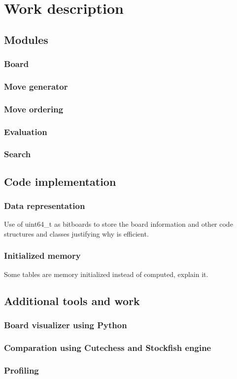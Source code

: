 \chapter{Work description}
\label{cap:descripcionTrabajo}

\section{Modules}
\label{sec:modules}

\subsection{Board}

\subsection{Move generator}

\subsection{Move ordering}

\subsection{Evaluation}

\subsection{Search}

\section{Code implementation}

\subsection{Data representation}

Use of uint64\_t as bitboards to store the board information and other code structures and classes justifying why is efficient.

\subsection{Initialized memory}

Some tables are memory initialized instead of computed, explain it.

\section{Additional tools and work}

\subsection{Board visualizer using Python}

\subsection{Comparation using Cutechess and Stockfish engine}

\subsection{Profiling}
